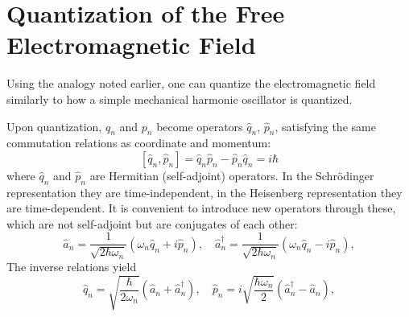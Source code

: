 \section{Quantization of the Free Electromagnetic Field}
\label{Ch1_quantumemf}
Using the analogy noted earlier, one can quantize
the electromagnetic field similarly to how a simple
mechanical harmonic oscillator is quantized.

Upon quantization, $q_n$ and $p_n$ become operators $\hat{q}_n$,
$\hat{p}_n$, satisfying the same commutation relations as
coordinate and momentum:
\begin{equation}
\left[\hat{q}_n, \hat{p}_n\right] = \hat{q}_n\hat{p}_n -
\hat{p}_n \hat{q}_n = i\hbar
\label{eqCh1_comut}
\end{equation}
where $\hat{q}_n$ and $\hat{p}_n$ are Hermitian (self-adjoint)
operators. In the Schrödinger representation they are time-independent, in the Heisenberg representation they are time-dependent. It is convenient to introduce new operators through these, which are not self-adjoint but are conjugates of each other:
\begin{equation}
\hat{a}_n = \frac{1}{\sqrt{2 \hbar \omega_n}}
\left( \omega_n \hat{q}_n + i \hat{p}_n\right),
\quad
\hat{a}_n^{\dag} = \frac{1}{\sqrt{2 \hbar \omega_n}}
\left( \omega_n \hat{q}_n - i \hat{p}_n\right),
\label{eqCh1_aadef}
\end{equation}
The inverse relations yield
\begin{equation}
\hat{q}_n = \sqrt{\frac{\hbar}{2 \omega_n}}
\left(\hat{a}_n + \hat{a}_n^{\dag}\right),
\quad
\hat{p}_n = i \sqrt{\frac{\hbar \omega_n}{2}}
\left(\hat{a}_n^{\dag} - \hat{a}_n\right),
\label{eqCh1_qpdef}
\end{equation}


